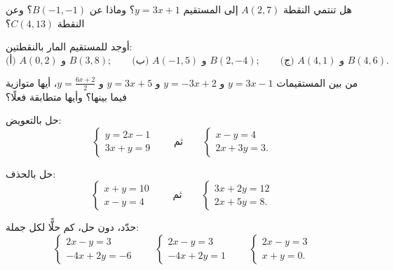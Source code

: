 \begin{exercise}[$\star$]\label{exo:g10:lines:2}
هل تنتمي النقطة $A(2, 7)$ إلى المستقيم $y = 3x + 1$؟ وماذا عن $B(-1, -1)$؟
وعن النقطة $C(4, 13)$؟
\end{exercise}

\begin{exercise}[$\star$]\label{exo:g10:lines:3}
أوجد  للمستقيم المار بالنقطتين:
\[
\text{(أ) } A(0, 2) \text{ و } B(3, 8);
\qquad
\text{(ب) } A(-1, 5) \text{ و } B(2, -4);
\qquad
\text{(ج) } A(4, 1) \text{ و } B(4, 6).
\]
\end{exercise}

\begin{exercise}[$\star$]\label{exo:g10:lines:4}
من بين المستقيمات $y = 3x - 1$ و $y = -3x + 2$ و $y = 3x + 5$ و
$y = \frac{6x + 2}{2}$، أيها متوازية فيما بينها؟ وأيها
متطابقة فعلًا؟
\end{exercise}

\begin{exercise}[$\star$]\label{exo:g10:lines:5}
حل بالتعويض:
\[
\begin{cases}
y = 2x - 1 \\
3x + y = 9
\end{cases}
\qquad\text{ثم}\qquad
\begin{cases}
x - y = 4 \\
2x + 3y = 3 .
\end{cases}
\]
\end{exercise}

\begin{exercise}[$\star$]\label{exo:g10:lines:6}
حل بالحذف:
\[
\begin{cases}
x + y = 10 \\
x - y = 4
\end{cases}
\qquad\text{ثم}\qquad
\begin{cases}
3x + 2y = 12 \\
2x + 5y = 8 .
\end{cases}
\]
\end{exercise}

\begin{exercise}[$\star\star$]\label{exo:g10:lines:7}
حدّد، دون حل، كم حلًّا لكل جملة:
\[
\begin{cases}
2x - y = 3 \\
-4x + 2y = -6
\end{cases}
\qquad
\begin{cases}
2x - y = 3 \\
-4x + 2y = 1
\end{cases}
\qquad
\begin{cases}
2x - y = 3 \\
x + y = 0 .
\end{cases}
\]
\end{exercise}


